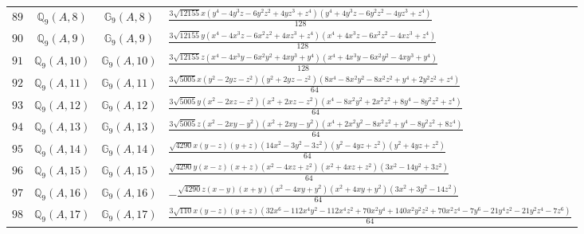 \documentclass[fleqn,8pt,landscape]{jsarticle}
\begin{document}
\begin{table}[ht!]
\begin{center}
\begin{tabular}{cccl}
$ 89 $ & $ \mathbb{Q}_{9}(A,8) $ & $ \mathbb{G}_{9}(A,8) $ & $ \frac{3 \sqrt{12155} x \left(y^{4} - 4 y^{3} z - 6 y^{2} z^{2} + 4 y z^{3} + z^{4}\right) \left(y^{4} + 4 y^{3} z - 6 y^{2} z^{2} - 4 y z^{3} + z^{4}\right)}{128} $ \\
$ 90 $ & $ \mathbb{Q}_{9}(A,9) $ & $ \mathbb{G}_{9}(A,9) $ & $ \frac{3 \sqrt{12155} y \left(x^{4} - 4 x^{3} z - 6 x^{2} z^{2} + 4 x z^{3} + z^{4}\right) \left(x^{4} + 4 x^{3} z - 6 x^{2} z^{2} - 4 x z^{3} + z^{4}\right)}{128} $ \\
$ 91 $ & $ \mathbb{Q}_{9}(A,10) $ & $ \mathbb{G}_{9}(A,10) $ & $ \frac{3 \sqrt{12155} z \left(x^{4} - 4 x^{3} y - 6 x^{2} y^{2} + 4 x y^{3} + y^{4}\right) \left(x^{4} + 4 x^{3} y - 6 x^{2} y^{2} - 4 x y^{3} + y^{4}\right)}{128} $ \\
$ 92 $ & $ \mathbb{Q}_{9}(A,11) $ & $ \mathbb{G}_{9}(A,11) $ & $ \frac{3 \sqrt{5005} x \left(y^{2} - 2 y z - z^{2}\right) \left(y^{2} + 2 y z - z^{2}\right) \left(8 x^{4} - 8 x^{2} y^{2} - 8 x^{2} z^{2} + y^{4} + 2 y^{2} z^{2} + z^{4}\right)}{64} $ \\
$ 93 $ & $ \mathbb{Q}_{9}(A,12) $ & $ \mathbb{G}_{9}(A,12) $ & $ \frac{3 \sqrt{5005} y \left(x^{2} - 2 x z - z^{2}\right) \left(x^{2} + 2 x z - z^{2}\right) \left(x^{4} - 8 x^{2} y^{2} + 2 x^{2} z^{2} + 8 y^{4} - 8 y^{2} z^{2} + z^{4}\right)}{64} $ \\
$ 94 $ & $ \mathbb{Q}_{9}(A,13) $ & $ \mathbb{G}_{9}(A,13) $ & $ \frac{3 \sqrt{5005} z \left(x^{2} - 2 x y - y^{2}\right) \left(x^{2} + 2 x y - y^{2}\right) \left(x^{4} + 2 x^{2} y^{2} - 8 x^{2} z^{2} + y^{4} - 8 y^{2} z^{2} + 8 z^{4}\right)}{64} $ \\
$ 95 $ & $ \mathbb{Q}_{9}(A,14) $ & $ \mathbb{G}_{9}(A,14) $ & $ \frac{\sqrt{4290} x \left(y - z\right) \left(y + z\right) \left(14 x^{2} - 3 y^{2} - 3 z^{2}\right) \left(y^{2} - 4 y z + z^{2}\right) \left(y^{2} + 4 y z + z^{2}\right)}{64} $ \\
$ 96 $ & $ \mathbb{Q}_{9}(A,15) $ & $ \mathbb{G}_{9}(A,15) $ & $ \frac{\sqrt{4290} y \left(x - z\right) \left(x + z\right) \left(x^{2} - 4 x z + z^{2}\right) \left(x^{2} + 4 x z + z^{2}\right) \left(3 x^{2} - 14 y^{2} + 3 z^{2}\right)}{64} $ \\
$ 97 $ & $ \mathbb{Q}_{9}(A,16) $ & $ \mathbb{G}_{9}(A,16) $ & $ - \frac{\sqrt{4290} z \left(x - y\right) \left(x + y\right) \left(x^{2} - 4 x y + y^{2}\right) \left(x^{2} + 4 x y + y^{2}\right) \left(3 x^{2} + 3 y^{2} - 14 z^{2}\right)}{64} $ \\
$ 98 $ & $ \mathbb{Q}_{9}(A,17) $ & $ \mathbb{G}_{9}(A,17) $ & $ \frac{3 \sqrt{110} x \left(y - z\right) \left(y + z\right) \left(32 x^{6} - 112 x^{4} y^{2} - 112 x^{4} z^{2} + 70 x^{2} y^{4} + 140 x^{2} y^{2} z^{2} + 70 x^{2} z^{4} - 7 y^{6} - 21 y^{4} z^{2} - 21 y^{2} z^{4} - 7 z^{6}\right)}{64} $ \\

\end{tabular}
\end{center}
\end{table}
\end{document}
